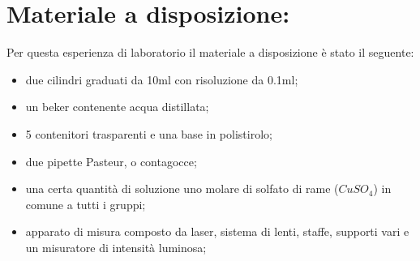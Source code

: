 \section{Materiale a disposizione:}

Per questa esperienza di laboratorio il materiale a disposizione è stato il seguente:
\begin{itemize}
	\item{due cilindri graduati da 10$\si{\milli\litre}$ con risoluzione da 0.1$\si{\milli\litre}$;}
    \item{un beker contenente acqua distillata;}
	\item{5 contenitori trasparenti e una base in polistirolo;}
	\item{due pipette Pasteur, o contagocce;}
	\item{una certa quantità di soluzione uno molare di solfato di rame ($CuSO_4$) in comune a tutti i gruppi;}
	\item{apparato di misura composto da laser, sistema di lenti, staffe, supporti vari e un misuratore di intensità luminosa;}
\end{itemize}

